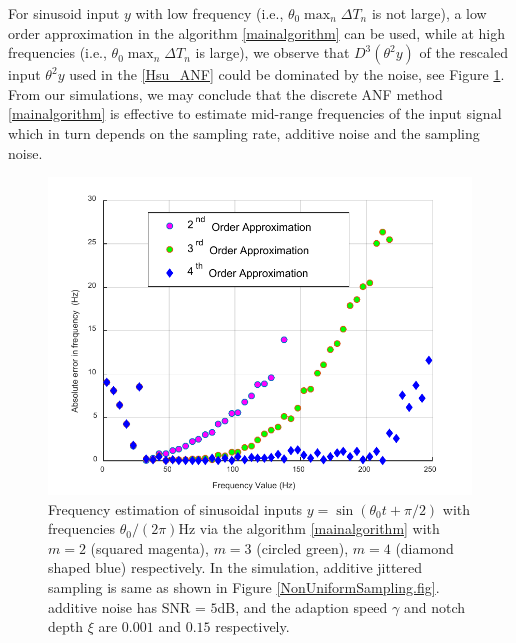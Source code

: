 \documentclass{UCF_ETD}
\begin{document}
For sinusoid input $y$ with low frequency (i.e.,  $\theta_0\max_n \Delta T_n$ is not large), %
a low order approximation in  the  algorithm \eqref{mainalgorithm} can be used,  while  at high frequencies (i.e.,  $\theta_0\max_n \Delta T_n$ is large), we observe that
 $D^3(\theta^2 y)$ of the rescaled input $\theta^2 y$ used in the \eqref{Hsu_ANF}
could be dominated by the noise,
see Figure \ref{ordercomparison.fig}.
 From our simulations, we  may conclude that the
discrete ANF method \eqref{mainalgorithm}
is effective to estimate  mid-range frequencies  of the input signal which in turn depends on the sampling rate, additive noise and the sampling noise.

\begin{figure}[H]
\begin{center}
\includegraphics[scale=0.9]{NonuniformANF/OrderComparison}
\caption{Frequency estimation of  sinusoidal inputs $y= \sin (\theta_0 t+\pi/2)$ with frequencies
$\theta_0/(2\pi)$Hz
  via the algorithm
\eqref{mainalgorithm} with $m=2$ (squared magenta), $m=3$ (circled green), $m=4$ (diamond shaped blue) respectively. In the simulation, additive jittered sampling
is same as shown in Figure \ref{NonUniformSampling.fig}.
additive noise  has SNR = $5$dB,
and the adaption speed $\gamma$ and  notch depth $\xi$ %
are $ 0.001$ and  $0.15$ respectively.
 }
\label{ordercomparison.fig}
\end{center}
\end{figure}
\end{document}
